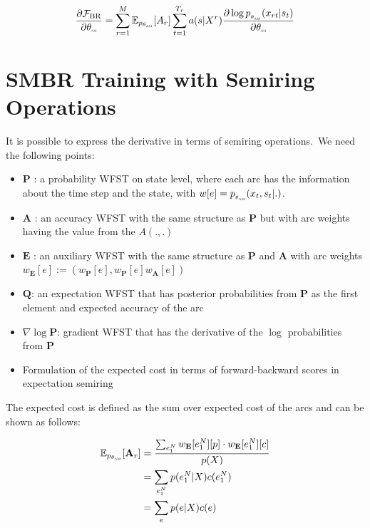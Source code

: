 \documentclass[a4paper,13.5pt]{extarticle}
\def\am{$\theta_{\scaleto{\text{AM}}{2pt}}$}
\begin{document}
	
	\begin{align}
		\label{derivative}
		\frac{\partial\mathcal{F_{\text{BR}}}}{\partial \theta_{\scaleto{\text{AM}}{2pt}}} =   \sum_{r=1}^M \mathbb{E}_{p_\text{\am}}[A_r]  \sum_{t=1}^{T_r} a(s|X^r) \frac{\partial \log  p_{_{\theta_{\scaleto{\text{AM}}{2pt}}}}(x_{rt}|s_t)}{\partial \theta_{\scaleto{\text{AM}}{2pt}}}
	\end{align}
	
	\newpage
	\section{SMBR  Training with Semiring Operations}
	\label{smbr}
	
	It is possible to express the derivative in terms of semiring operations.\ We need the following points:
	\begin{itemize}
		\item $\mathbf{P}$ : a probability WFST on state level, where each arc has the information about the time step and the state, with $w[e] = p_{_{\theta_{\scaleto{\text{AM}}{2pt}}}}(x_{t}, s_t | .)$.
		\item  $\mathbf{A}$ :  an accuracy WFST with the same structure as $\mathbf{P}$ but with arc weights having the value from the $A(.,.)$
		\item  $\mathbf{E}$ : an auxiliary WFST with the same structure as $\mathbf{P}$ and $\mathbf{A}$ with arc weights $w_{\mathbf{E}}[e] := (w_{\mathbf{P}}[e], w_{\mathbf{P}}[e]w_{\mathbf{A}}[e])$
		\item  $\mathbf{Q}$: an expectation WFST that has posterior probabilities from $\mathbf{P}$  as the first element and expected accuracy of the arc
		\item $\nabla \log \mathbf{P}$:  gradient WFST that has the derivative of the $\log$ probabilities from $\mathbf{P}$
		\item Formulation of the expected cost in terms of forward-backward scores in expectation semiring
		
	\end{itemize}
	
	The expected cost is defined as the sum over expected cost of the arcs and can be shown as follows:
	
	\begin{align*}
		\mathbb{E}_{p_\text{\am}}[\mathbf{A}_r] &= \frac{\sum_{e_1^N} w_{\mathbf{E}}[e_1^N][p] \cdot w_{\mathbf{E}}[e_1^N][c]}{p(X)}\\
		&=	\sum_{e_1^N} p(e_1^N|X)c(e_1^N)\\
		&=	\sum_{e} p(e|X)c(e)
	\end{align*}
	
\end{document}
